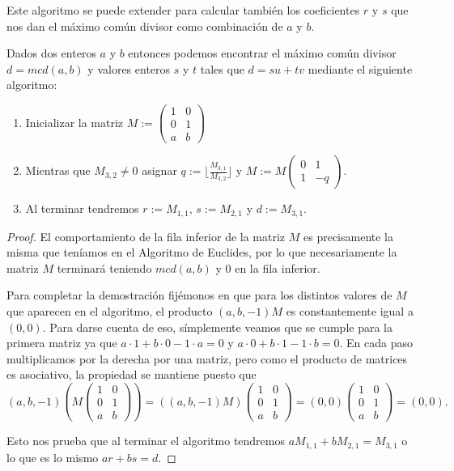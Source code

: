 Este algoritmo se puede extender para calcular tambi\'en los coeficientes $r$ y $s$ que nos dan el m\'aximo com\'un divisor como combinaci\'on de $a$ y $b$.

\begin{algorithm}
Dados dos enteros $a$ y $b$ entonces podemos encontrar el m\'aximo com\'un divisor
$d = mcd(a,b)$ y valores enteros $s$ y $t$ tales que $d = su+tv$ mediante el siguiente algoritmo:
\begin{enumerate}
\item Inicializar la matriz $M := \left(\begin{array}{cc} 1 & 0 \\ 0 & 1 \\ a & b \end{array}\right)$
\item Mientras que $M_{3,2} \not= 0$ asignar $q := \lfloor \frac{M_{3,1}}{M_{3,2}} \rfloor$ y $M := M \left( \begin{array}{cc} 0 & 1 \\ 1 & -q
\end{array}  \right)$.
\item Al terminar tendremos $r := M_{1,1}$, $s := M_{2,1}$ y $d := M_{3,1}$.
\end{enumerate}
\end{algorithm}
\begin{proof}
El comportamiento de la fila inferior de la matriz $M$ es precisamente la misma que ten\'iamos en el Algoritmo de Euclides, por lo que necesariamente la matriz $M$ terminar\'a teniendo
$mcd(a,b)$ y $0$ en la fila inferior.

Para completar la demostraci\'on fij\'emonos en que para los distintos valores de $M$ que aparecen en el algoritmo, el producto $\left( a,b,-1\right) M$ es constantemente igual a
$\left(0,0\right)$. Para darse cuenta de eso, s\'implemente veamos que se cumple para la primera matriz ya que $a\cdot 1 + b \cdot 0 - 1 \cdot a = 0$ y
$a\cdot 0 + b \cdot 1 - 1 \cdot b = 0$. En cada paso multiplicamos por la derecha por una matriz, pero como el producto de matrices es asociativo, la propiedad se mantiene puesto que
\[(a,b,-1)\left(M \left(\begin{array}{cc} 1 & 0 \\ 0 & 1 \\ a & b \end{array}\right)\right) = \left((a,b,-1)M \right)\left(\begin{array}{cc} 1 & 0 \\ 0 & 1 \\ a & b \end{array}\right) =
(0,0)\left(\begin{array}{cc} 1 & 0 \\ 0 & 1 \\ a & b \end{array}\right) = (0,0).\]

Esto nos prueba que al terminar el algoritmo tendremos $a M_{1,1} + b M_{2,1} = M_{3,1}$ o lo que es lo mismo $a r + b s = d$.
\end{proof}

